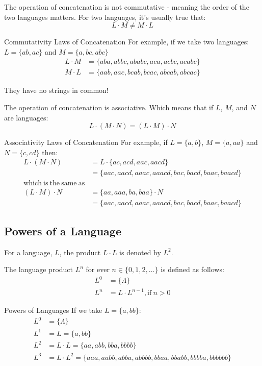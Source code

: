 The operation of concatenation is not commutative - meaning the order of the two languages matters. For two languages, it's usually true that:
\[L \cdot M \neq M \cdot L\]

\begin{example}{Commutativity Laws of Concatenation}
For example, if we take two languages: $L = \{ab, ac\}$ and $M = \{a, bc, abc\}$
\begin{align*}
  L \cdot M &= \{aba, abbc, ababc, aca, acbc, acabc\}  \\
  M \cdot L &= \{aab, aac, bcab, bcac, abcab, abcac\}
\end{align*}

They have no strings in common!
\end{example}

The operation of concatenation is associative. Which means that if $L$, $M$, and $N$ are languages:
\[L \cdot (M \cdot N) = (L \cdot M) \cdot N\]

\begin{example}{Associativity Laws of Concatenation}
For example, if $L = \{a, b\}$, $M = \{a, aa\}$ and $N = \{c, cd\}$ then:
\begin{align*}
    L \cdot (M \cdot N) &= L \cdot \{ac, acd, aac, aacd\} \\
    &= \{aac, aacd, aaac, aaacd, bac, bacd, baac, baacd\}\\
    \mathrm{which\ is\ the\ same\ as}\\
    (L \cdot M) \cdot N &= \{aa, aaa, ba, baa\} \cdot N\\
    &= \{aac, aacd, aaac, aaacd, bac, bacd, baac, baacd\}
\end{align*}
\end{example}

\subsection{Powers of a Language}
For a language, $L$, the product $L \cdot L$ is denoted by $L^2$.

The language product $L^n$ for ever $n \in \{0, 1, 2, \ldots\}$ is defined as follows:
\begin{align*}
    L^0 &= \{\Lambda\}\\
    L^n &= L \cdot L^{n-1}, \mathrm{if\ } n > 0
\end{align*}

\begin{example}{Powers of Languages}
If we take $L = \{a, bb\}$:
\begin{align*}
L^0 &= \{\Lambda\} \\
L^1 &= L = \{a, bb\}\\
L^2 &= L \cdot L = \{aa, abb, bba, bbbb\}\\
L^3 &= L \cdot L^2 = \{aaa, aabb, abba, abbbb, bbaa, bbabb, bbbba, bbbbbb\}
\end{align*}
\end{example}

